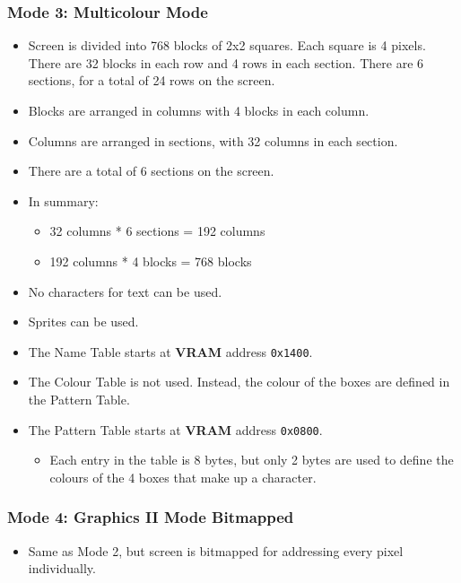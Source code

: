 \documentclass[a4paper,11pt]{article}
\begin{document}
        \subsubsection{Mode 3: \textbf{Multicolour Mode}}
        \begin{itemize}
            \item Screen is divided into 768 blocks of 2x2 squares. Each square
                is 4 pixels. There are 32 blocks in each row and 4 rows in each
                section. There are 6 sections, for a total of 24 rows on the
                screen.
            \item Blocks are arranged in columns with 4 blocks in each column.
            \item Columns are arranged in sections, with 32 columns in each
                section.
            \item There are a total of 6 sections on the screen.
            \item In summary:
            \begin{itemize}
                \item 32 columns * 6 sections = 192 columns
                \item 192 columns * 4 blocks = 768 blocks
            \end{itemize}
            \item No characters for text can be used.
            \item Sprites can be used.
            \item The Name Table starts at \textbf{VRAM} address \texttt{0x1400}.
            \item The Colour Table is not used. Instead, the colour of the boxes
            are defined in the Pattern Table.
            \item The Pattern Table starts at \textbf{VRAM} address \texttt{0x0800}.
            \begin{itemize}
                \item Each entry in the table is 8 bytes, but only 2 bytes are
                        used to define the colours of the 4 boxes that make up
                        a character.
            \end{itemize}
        \end{itemize}

        \subsubsection{Mode 4: \textbf{Graphics II Mode Bitmapped}}
        \begin{itemize}
            \item Same as Mode 2, but screen is bitmapped for addressing every
                pixel individually.
        \end{itemize}
\end{document}
